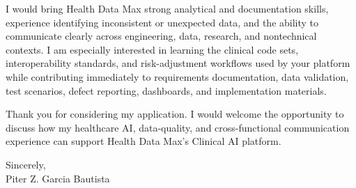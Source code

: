 \documentclass[10pt,letterpaper]{article}
\begin{document}
I would bring Health Data Max strong analytical and documentation skills,
experience identifying inconsistent or unexpected data, and the ability to
communicate clearly across engineering, data, research, and nontechnical
contexts. I am especially interested in learning the clinical code sets,
interoperability standards, and risk-adjustment workflows used by your
platform while contributing immediately to requirements documentation, data
validation, test scenarios, defect reporting, dashboards, and implementation
materials.

Thank you for considering my application. I would welcome the opportunity to
discuss how my healthcare AI, data-quality, and cross-functional communication
experience can support Health Data Max's Clinical AI platform.

Sincerely,\\[10pt]
Piter Z. Garcia Bautista
\end{document}
